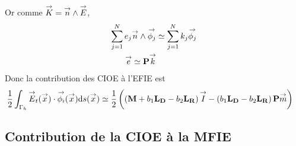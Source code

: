    Or comme \(\vK = \vn \pvect \vE\),
    \begin{equation*}
      \begin{aligned}
      \sum_{j=1}^N e_j \vn \pvect \phij & \simeq \sum_{j=1}^N k_j \phij
      \\
      \vect{e} \simeq \mPP \vect{k}
      \end{aligned}
    \end{equation*}
    Donc la contribution des CIOE à l'EFIE est
    \begin{equation*}
      \begin{aligned}
        \frac{1}{2} \int_{\Gamma_h} \vE_t(\vx) \cdot \phii(\vx) \dd{s}(\vx)
        & \simeq \frac{1}{2} \left( \left(\mM + b_1 \mLD - b_2 \mLR\right) \vect{I}  - \left( b_1 \mLD - b_2 \mLR\right) \mPP \vect{m}\right)
      \end{aligned}
    \end{equation*}

  \subsection{Contribution de la CIOE à la MFIE}

